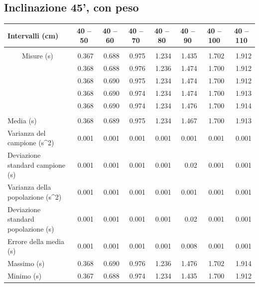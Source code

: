 \documentclass[12pt]{article} %
\begin{document}
	\subsection {Inclinazione 45', con peso}
		\begin{table}[H]
			\begin{tabular}{|l|r|r|r|r|r|r|r|}
			\hline
			Intervalli (cm) & \multicolumn{1}{c|}{40 – 50} & \multicolumn{1}{c|}{40 – 60} & \multicolumn{1}{c|}{40 – 70} & \multicolumn{1}{c|}{40 – 80 } & \multicolumn{1}{c|}{40 – 90} & \multicolumn{1}{c|}{40 – 100} & \multicolumn{1}{c|}{40 – 110} \\ \hline
			 & \multicolumn{ 7}{l|}{} \\ \hline
			\multicolumn{ 1}{|c|}{Misure (s)} & 0.367 & 0.688 & 0.975 & 1.234 & 1.435 & 1.702 & 1.912 \\ \cline{ 2- 8}
			\multicolumn{ 1}{|l|}{} & 0.368 & 0.688 & 0.976 & 1.236 & 1.474 & 1.700 & 1.912 \\ \cline{ 2- 8}
			\multicolumn{ 1}{|l|}{} & 0.368 & 0.690 & 0.975 & 1.234 & 1.474 & 1.700 & 1.912 \\ \cline{ 2- 8}
			\multicolumn{ 1}{|l|}{} & 0.368 & 0.690 & 0.974 & 1.234 & 1.474 & 1.700 & 1.913 \\ \cline{ 2- 8}
			\multicolumn{ 1}{|l|}{} & 0.368 & 0.690 & 0.974 & 1.234 & 1.476 & 1.700 & 1.914 \\ \hline
			 & \multicolumn{ 7}{c|}{} \\ \hline
			Media (s) & 0.368 & 0.689 & 0.975 & 1.234 & 1.467 & 1.700 & 1.913 \\ \hline
			Varianza del campione (s^2) & 0.001 & 0.001 & 0.001 & 0.001 & 0.001 & 0.001 & 0.001 \\ \hline
			Deviazione standard campione (s) & 0.001 & 0.001 & 0.001 & 0.001 & 0.02 & 0.001 & 0.001 \\ \hline
			Varianza della popolazione (s^2) & 0.001 & 0.001 & 0.001 & 0.001 & 0.001 & 0.001 & 0.001 \\ \hline
			Deviazione standard popolazione (s) & 0.001 & 0.001 & 0.001 & 0.001 & 0.02 & 0.001 & 0.001 \\ \hline
			Errore della media (s) & 0.001 & 0.001 & 0.001 & 0.001 & 0.008 & 0.001 & 0.001 \\ \hline
			Massimo (s) & 0.368 & 0.690 & 0.976 & 1.236 & 1.476 & 1.702 & 1.914 \\ \hline
			Minimo (s) & 0.367 & 0.688 & 0.974 & 1.234 & 1.435 & 1.700 & 1.912 \\ \hline
			\end{tabular}

		\label{45p}
		\end{table}
		
\end{document}

